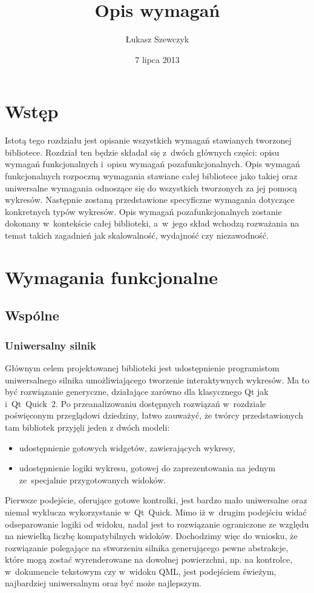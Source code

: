 \documentclass[11pt,twoside,a4paper,final]{article}
\begin{document}
\date{7 lipca 2013}
\title{Opis wymagań}

\author{Łukasz Szewczyk}
\maketitle


\section{Wstęp}
Istotą tego rozdziału jest opisanie wszystkich wymagań stawianych tworzonej bibliotece. 
Rozdział ten będzie składał się z~dwóch głównych części: opisu wymagań funkcjonalnych i~opisu wymagań pozafunkcjonalnych.\newline
Opis wymagań funkcjonalnych rozpoczną wymagania stawiane całej bibliotece jako takiej oraz uniwersalne wymagania odnoszące się do wszystkich tworzonych za jej pomocą wykresów. Następnie zostaną przedstawione specyficzne wymagania dotyczące konkretnych typów wykresów.\newline
Opis wymagań pozafunkcjonalnych zostanie dokonany w~kontekście całej biblioteki, a~w~jego skład wchodzą rozważania na temat takich zagadnień jak skalowalność, wydajność czy niezawodność.

\section{Wymagania funkcjonalne}
\subsection{Wspólne}
\subsubsection{Uniwersalny silnik}
Głównym celem projektowanej biblioteki jest udostępnienie programistom uniwersalnego silnika umożliwiającego tworzenie interaktywnych wykresów. Ma to być rozwiązanie generyczne, działające zarówno dla klasycznego Qt jak i~Qt~Quick~2. Po przeanalizowaniu dostępnych rozwiązań w~rozdziale poświęconym przeglądowi dziedziny, łatwo zauważyć, że twórcy przedstawionych tam bibliotek przyjęli jeden z dwóch modeli:
\begin{itemize}
\item{udostępnienie gotowych widgetów, zawierających wykresy,}
\item{udostępnienie logiki wykresu, gotowej do zaprezentowania na jednym ze~specjalnie przygotowanych widoków.}
\end{itemize}
Pierwsze podejście, oferujące gotowe kontrolki, jest bardzo mało uniwersalne oraz niemal wyklucza wykorzystanie w~Qt~Quick.
Mimo iż w~drugim podejściu widać odseparowanie logiki od widoku, nadal jest to rozwiązanie ograniczone ze względu na niewielką liczbę kompatybilnych widoków.
Dochodzimy więc do wniosku, że  rozwiązanie polegające na stworzeniu silnika generującego pewne abstrakcje, które mogą zostać wyrenderowane na dowolnej powierzchni, np. na kontrolce, w~dokumencie tekstowym czy w~widoku QML,
jest podejściem świeżym, najbardziej uniwersalnym oraz być może najlepszym.
\end{document}
